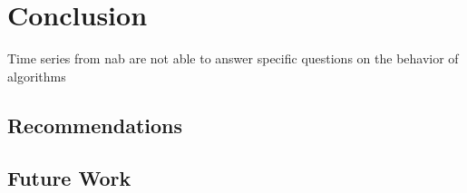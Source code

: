 \section{Conclusion}\label{sect:conclusion}
Time series from \gls{nab} are not able to answer specific questions on the
behavior of algorithms
\blindtext[1]

\subsection{Recommendations}\label{subsect:recommendations}
\blindtext[1]

\subsection{Future Work}
\blindtext[1]
